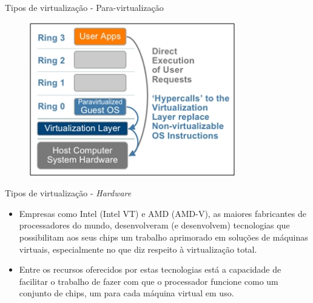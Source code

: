 \documentclass{beamer}
\begin{document}
\begin{frame}{Tipos de virtualização - Para-virtualização}
\begin{figure}[hbtp]
\centering
\includegraphics[width=9cm]{Images/paraVirt.jpg}
\label{figRotulo}
\end{figure}
\end{frame}

\begin{frame}{Tipos de virtualização - {\it Hardware}}
\begin{itemize}
\item Empresas como Intel (Intel VT) e AMD (AMD-V), as maiores fabricantes de processadores do mundo,
desenvolveram (e desenvolvem) tecnologias que possibilitam aos seus chips um trabalho
aprimorado em soluções de máquinas virtuais, especialmente no que diz respeito à
virtualização total.
\item Entre os recursos oferecidos por estas tecnologias está a capacidade de facilitar o
trabalho de fazer com que o processador funcione como um conjunto de chips, um para
cada máquina virtual em uso.

\end{itemize}
\end{frame}
\end{document}

